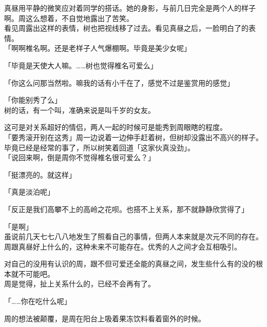 真昼用平静的微笑应对着同学的搭话。她的身影，与前几日完全是两个人的样子啊。周这么想着，不自觉地露出了苦笑。\\

看见周露出这样的表情，树也把视线移了过去。看见真昼之后，一脸明白了的表情。\\

「啊啊椎名啊。还是老样子人气爆棚啊。毕竟是美少女呢」

「毕竟是天使大人嘛。……树也觉得椎名可爱么」

「你这么问那当然啦。嘛我的话有小千在了，感觉不过是鉴赏用的感觉」

「你能别秀了么」\\

树的话，有一个叫，准确来说是叫千岁的女友。

这可是对关系超好的情侣，两人一起的时候可是能秀到周眼瞎的程度。\\

「要秀滚开别在这秀」周一边说着一边伸手赶着树，但树却没露出不高兴的样子。毕竟已经是经常的事了，所以树笑着回道「这家伙真没劲」。\\

「说回来啊，倒是周你不觉得椎名很可爱么？」

「挺漂亮的。就这样」

「真是淡泊呢」

「反正是我们高攀不上的高岭之花呗。也搭不上关系，那不就静静欣赏得了」

「是啊」\\

虽说前几天七七八八地发生了照看自己的事情，但两人本来就是次元不同的存在。\\

周跟真昼好上什么的，这种未来不可能存在。优秀的人之间才会互相吸引。

对自己的没用有认识的周，跟不但可爱还全能的真昼之间，发生些什么有的没的根本就不可能吧。\\

周是觉得，扯上关系什么的，已经不会再有了。\\

\vspace{2\baselineskip}

「……你在吃什么呢」

周的想法被颠覆，是周在阳台上吸着果冻饮料看着窗外的时候。
